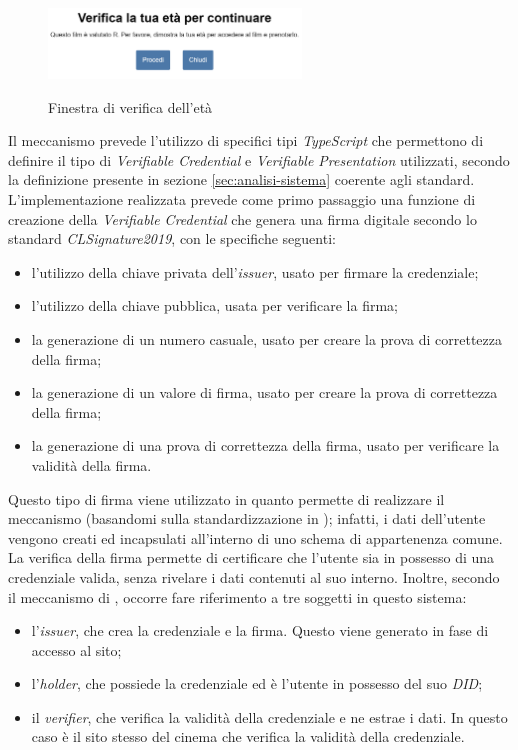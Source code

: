 \begin{figure}[h]
    \centering
    \includegraphics[width=0.6\textwidth, alt={Finestra visualizzata di verifica dell'età}]{immagini/frontend/age-verification.png}
    \caption{Finestra di verifica dell'età}\label{fig:verifica-eta}
\end{figure}

Il meccanismo prevede l'utilizzo di specifici tipi \textit{TypeScript} che permettono di definire il tipo di \textit{Verifiable Credential} e \textit{Verifiable Presentation}
utilizzati, secondo la definizione presente in sezione \ref{sec:analisi-sistema} coerente agli standard.
L'implementazione realizzata prevede come primo passaggio una funzione di creazione della \textit{Verifiable Credential} che genera una firma digitale secondo lo standard \textit{CLSignature2019}, con le specifiche seguenti:
\begin{itemize}
    \item l'utilizzo della chiave privata dell'\textit{issuer}, usato per firmare la credenziale;
    \item l'utilizzo della chiave pubblica, usata per verificare la firma;
    \item la generazione di un numero casuale, usato per creare la prova di correttezza della firma;
    \item la generazione di un valore di firma, usato per creare la prova di correttezza della firma;
    \item la generazione di una prova di correttezza della firma, usato per verificare la validità della firma.
\end{itemize}
Questo tipo di firma viene utilizzato in quanto permette di realizzare il meccanismo  (basandomi sulla standardizzazione in \cite{site:zkpstandard}); infatti, i dati dell'utente vengono creati ed incapsulati
all'interno di uno schema di appartenenza comune. La verifica della firma permette di certificare che l'utente sia in possesso di una credenziale valida, senza rivelare
i dati contenuti al suo interno. 
Inoltre, secondo il meccanismo di , occorre fare riferimento a tre soggetti in questo sistema:
\begin{itemize}
    \item l'\textit{issuer}, che crea la credenziale e la firma. Questo viene generato in fase di accesso al sito;
    \item l'\textit{holder}, che possiede la credenziale ed è l'utente in possesso del suo \textit{DID};
    \item il \textit{verifier}, che verifica la validità della credenziale e ne estrae i dati. In questo caso è il sito stesso del cinema che verifica la validità della credenziale.
\end{itemize}

